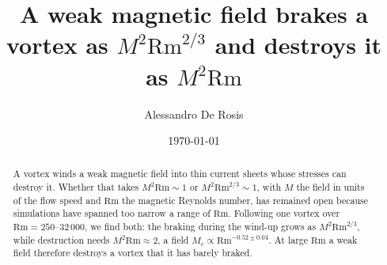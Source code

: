 \documentclass[aps,prl,twocolumn,reprint,amsmath,amssymb,superscriptaddress,floatfix]{revtex4-2}
\newcommand{\Rm}{\mathrm{Rm}}
\begin{document}
\renewcommand{\topfraction}{0.9}
\renewcommand{\bottomfraction}{0.9}
\renewcommand{\textfraction}{0.07}
\renewcommand{\floatpagefraction}{0.8}
\renewcommand{\dbltopfraction}{0.9}
\setcounter{topnumber}{3}
\setcounter{bottomnumber}{2}
\setcounter{totalnumber}{5}


\title{A weak magnetic field brakes a vortex as \texorpdfstring{$M^2\Rm^{2/3}$}{M2 Rm2/3} and destroys it as \texorpdfstring{$M^2\Rm$}{M2 Rm}}

\author{Alessandro De Rosis}

\date{\today}

\begin{abstract}
A vortex winds a weak magnetic field into thin current sheets whose stresses can
destroy it. Whether that takes $M^2\Rm\sim1$ or $M^2\Rm^{2/3}\sim1$, with $M$ the
field in units of the flow speed and $\Rm$ the magnetic Reynolds number, has
remained open because simulations have spanned too narrow a range of $\Rm$.
Following one vortex over $\Rm=250$--$32\,000$, we find both: the braking during the wind-up grows as
$M^2\Rm^{2/3}$, while destruction needs $M^2\Rm\approx2$, a field
$M_c\propto\Rm^{-0.52\pm0.04}$. At large $\Rm$ a weak field therefore destroys a
vortex that it has barely braked.
\end{abstract}

\maketitle
\end{document}
